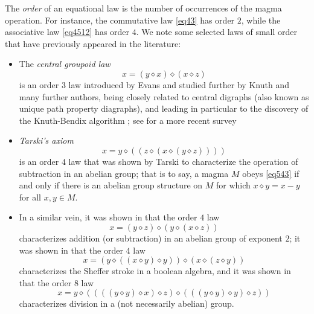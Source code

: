 \documentclass[12pt]{article}
\theoremstyle{definition}
\newcommand{\op}{\diamond}
\begin{document}
The \emph{order} of an equational law is the number of occurrences of the magma operation.  For instance, the commutative law \eqref{eq43} has order $2$, while the associative law \eqref{eq4512} has order $4$.  We note some selected laws of small order that have previously appeared in the literature:
\begin{itemize}
\item The \emph{central groupoid law}
\begin{equation}\label{eq168}\tag{E168}
x = (y \op x) \op (x \op z)
\end{equation}
is an order $3$ law introduced by Evans \cite{evans} and studied further by Knuth \cite{knuth} and many further authors, being closely related to central digraphs (also known as unique path property diagraphs), and leading in particular to the discovery of the Knuth-Bendix algorithm \cite{knuth-bendix}; see \cite{klt} for a more recent survey
\item \emph{Tarski's axiom}
\begin{equation}\label{eq543}\tag{E543}
    x = y \op ( (z \op (x \op (y \op z))))
\end{equation}
is an order $4$ law that was shown by Tarski \cite{Tarski1938} to characterize the operation of subtraction in an abelian group; that is to say, a magma $M$ obeys \eqref{eq543} if and only if there is an abelian group structure on $M$ for which $x \op y = x-y$ for all $x,y \in M$.
\item In a similar vein, it was shown in \cite{mendelsohn-padmanabhan} that the order $4$ law
\begin{equation}\label{eq1571}\tag{E1571}
    x = (y \op z) \op (y \op (x \op z))
\end{equation}
characterizes addition (or subtraction) in an abelian group of exponent $2$; it was shown in \cite{mccune_et_al} that the order $4$ law
\begin{equation}\label{eq345169}\tag{E345169}
    x = (y \op ((x \op y) \op y)) \op (x \op (z \op y))
\end{equation}
characterizes the Sheffer stroke in a boolean algebra, and it was shown in \cite{higman-neumann} that the order $8$ law
\begin{equation}\label{eq42323216}\tag{E42323216}
x = y \op ((((y \op y) \op x) \op z) \op (((y \op y) \op y) \op z))
\end{equation}
characterizes division in a (not necessarily abelian) group.
\end{itemize}
\end{document}
